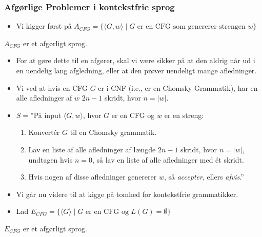 \begin{frame}[allowframebreaks]
	\frametitle{Afgørlige Problemer i kontekstfrie sprog}
	\begin{itemize}
		\item Vi kigger først på $A_{CFG} = \{\langle G, w \rangle \mid G \text{ er en CFG som genererer strengen }w\}$
	\end{itemize}
	\begin{theorem}
		$A_{CFG}$ er et afgørligt sprog.
	\end{theorem}

	\begin{itemize}
		\item For at gøre dette til en afgører, skal vi være sikker på at den aldrig når ud i en uendelig lang afgledning, eller at den prøver uendeligt mange afledninger.
		\item Vi ved at hvis en CFG $G$ er i CNF (i.e., er en Chomsky Grammatik), har en alle afledninger af $w$ $2n-1$ skridt, hvor $n = |w|$.
		\item $S = $''På input \(\langle G, w \rangle\), hvor $G$ er en CFG og $w$ er en streng:
		      \begin{enumerate}
			      \item Konvertér $G$ til en Chomsky grammatik.
			      \item Lav en liste af alle afledninger af længde $2n-1$ skridt, hvor $n =|w|$, undtagen hvis $n = 0$, så lav en liste af alle afledninger med ét skridt.
			      \item Hvis nogen af disse afledninger genererer $w$, så \textit{accepter}, ellers \textit{afvis}.''
		      \end{enumerate}
	\end{itemize}

	\begin{itemize}
		\item Vi går nu videre til at kigge på tomhed for kontekstfrie grammatikker.
		\item Lad $E_{CFG} = \{\langle G \rangle \mid G \text{ er en CFG og } L(G) = \emptyset \}$
	\end{itemize}

	\begin{theorem}
		$E_{CFG}$ er et afgørligt sprog.
	\end{theorem}


\end{frame}
